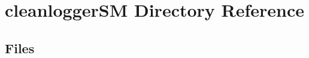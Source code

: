 \section{cleanlogger\+SM Directory Reference}
\label{dir_b0b083f80df66fcc6da2338c004e05a7}
\subsection*{Files}
\begin{DoxyCompactItemize}
\end{DoxyCompactItemize}
